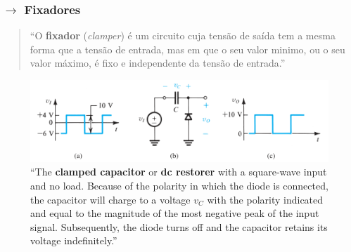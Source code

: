 \subsubsection[2.4.2 Fixadores]{$\pmb{\rightarrow}$ Fixadores}

\begin{quote}
    ``O \textbf{fixador} (\textit{clamper}) é um circuito cuja tensão de saída tem a mesma forma que a tensão de entrada, mas em que o seu valor minimo, ou o seu valor máximo, é fixo e independente da tensão de entrada.''\cite{medeiros:ICEE}
\end{quote}

\vspace{-1.5em}
\begin{figure}[H]
    \centering
    \includegraphics[width=0.85\linewidth]{img/2/fixador.png}
    \caption{``The \textbf{clamped capacitor} or \textbf{dc restorer} with a square-wave input and no load. Because of the polarity in which the diode is connected, the capacitor will charge to a voltage $v_C$ with the polarity indicated and equal to the magnitude of the most negative peak of the input signal. Subsequently, the diode turns off and the capacitor retains its voltage indefinitely.''\cite{sedra-smith:microelectronic-circuits}}
    \label{fig:fixador}
\end{figure}
